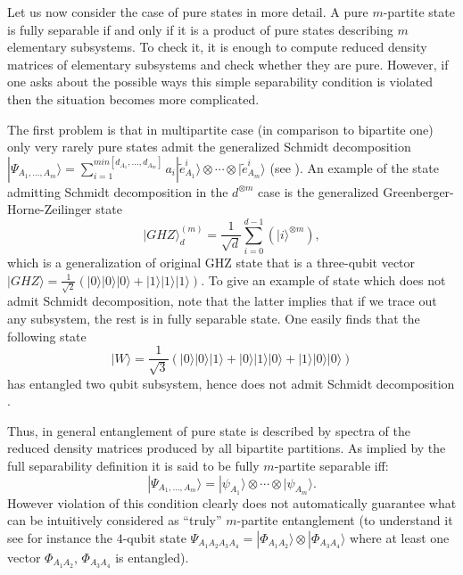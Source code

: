 \documentclass[rmp,12pt,preprint]{revtex4-2}
\begin{document}
Let us now consider the case of pure states in more detail. A pure
$m$-partite state is fully separable if and only if it is a product of
pure states describing $m$ elementary subsystems. To check it, it is
enough to compute reduced density matrices of elementary subsystems
and check whether they are pure. However, if one asks about the
possible ways this simple separability condition is violated then the
situation becomes more complicated.

The first problem is that in multipartite case (in comparison to
bipartite one) only very rarely pure states admit the generalized
Schmidt decomposition $|\Psi_{A_{1},\ldots,A_{m}}\rangle =
\sum_{i=1}^{min[d_{A_1},\ldots,d_{A_{m}}]} a_{i} |\tilde{e}_{A_{1}}^{i}
\rangle\otimes \cdots \otimes |\tilde{e}_{A_{m}}^{i}\rangle $ (see
\cite{PeresSchmidt,Thaplyial}). An example of the state admitting
Schmidt decomposition in the $d^{\otimes m}$ case is the generalized
Greenberger-Horne-Zeilinger state
\begin{equation}
|GHZ\rangle^{(m)}_{d}=\frac{1}{\sqrt{d}}
\sum_{i=0}^{d-1}(|i\rangle^{\otimes m}), \label{GHZ}
\end{equation}
which is a generalization of original GHZ state \cite{GHZk} that is
a three-qubit vector $|GHZ\rangle=
\frac{1}{\sqrt{2}}(|0\rangle|0\rangle|0\rangle+|1\rangle|1\rangle|1\rangle)$.
To give an example of state which does not admit Schmidt
decomposition, note that the latter implies that if we trace out any
subsystem, the rest is in fully separable state. One easily finds
that the following state
\begin{equation}
|W\rangle=
\frac{1}{\sqrt{3}}(|0\rangle|0\rangle|1\rangle+|0\rangle|1\rangle|0\rangle+
|1\rangle|0\rangle|0\rangle)
\end{equation}
has entangled two qubit subsystem, hence does not admit Schmidt
decomposition \cite{DurVC00-wstate}.

Thus, in general entanglement of pure state is described by spectra of
the reduced density matrices produced by all bipartite partitions. As
implied by the full separability definition it is said to be fully
$m$-partite separable iff:
\begin{equation}
|\Psi_{A_{1},\ldots,A_{m}}\rangle =|\psi_{A_{1}}\rangle \otimes \cdots
\otimes |\psi_{A_{m}} \rangle. \label{ProductPure}
\end{equation}
However violation of this condition clearly does not automatically
guarantee what can be intuitively considered as ``truly'' $m$-partite
entanglement (to understand it see for instance the $4$-qubit state
$\Psi_{A_{1}A_{2}A_{3}A_{4}}=|\Phi_{A_{1}A_{2}}\rangle \otimes
|\Phi_{A_{3}A_{4}}\rangle $ where at least one vector
$\Phi_{A_{1}A_{2}}$, $\Phi_{A_{3}A_{4}}$ is entangled).
\end{document}
